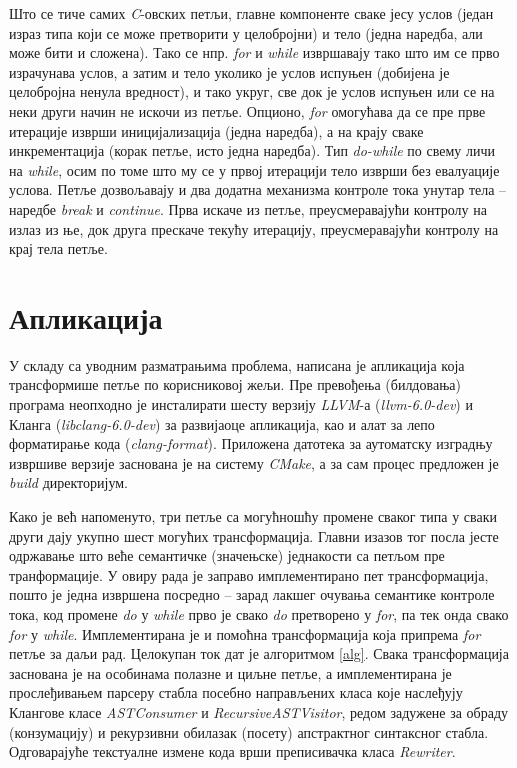 \documentclass[a4paper]{article}
\begin{document}
Што се тиче самих \textit{C}-овских петљи, главне компоненте сваке јесу услов (један израз типа који се може претворити у целобројни) и тело (једна наредба, али може бити и сложена). Тако се нпр. \textit{for} и \textit{while} извршавају тако што им се прво израчунава услов, а затим и тело уколико је услов испуњен (добијена је целобројна ненула вредност), и тако укруг, све док је услов испуњен или се на неки други начин не искочи из петље. Опционо, \textit{for} омогућава да се пре прве итерације изврши иницијализација (једна наредба), а на крају сваке инкрементација (корак петље, исто једна наредба). Тип \textit{do-while} по свему личи на \textit{while}, осим по томе што му се у првој итерацији тело изврши без евалуације услова. Петље дозвољавају и два додатна механизма контроле тока унутар тела -- наредбе \textit{break} и \textit{continue}. Прва искаче из петље, преусмеравајући контролу на излаз из ње, док друга прескаче текућу итерацију, преусмеравајући контролу на крај тела петље.

\section{Апликација}

У складу са уводним разматрањима проблема, написана је апликација која трансформише петље по корисниковој жељи. Пре превођења (билдовања) програма неопходно је инсталирати шесту верзију \textit{LLVM}-а (\textit{llvm-6.0-dev}) и Кланга (\textit{libclang-6.0-dev}) за развијаоце апликација, као и алат за лепо форматирање кода (\textit{clang-format}). Приложена датотека за аутоматску изградњу извршиве верзије заснована је на систему \textit{CMake}, а за сам процес предложен је \textit{build} директоријум.

Како је већ напоменуто, три петље са могућношћу промене сваког типа у сваки други дају укупно шест могућих трансформација. Главни изазов тог посла јесте одржавање што веће семантичке (значењске) једнакости са петљом пре транформације. У овиру рада је заправо имплементирано пет трансформација, пошто је једна извршена посредно -- зарад лакшег очувања семантике контроле тока, код промене \textit{do} у \textit{while} прво је свако \textit{do} претворено у \textit{for}, па тек онда свако \textit{for} у \textit{while}. Имплементирана је и помоћна трансформација која припрема \textit{for} петље за даљи рад. Целокупан ток дат је алгоритмом \ref{alg}. Свака трансформација заснована је на особинама полазне и циљне петље, а имплементирана је прослеђивањем парсеру стабла посебно направљених класа које наслеђују Клангове класе \textit{ASTConsumer} и \textit{RecursiveASTVisitor}, редом задужене за обраду (конзумацију) и рекурзивни обилазак (посету) апстрактног синтаксног стабла. Одговарајуће текстуалне измене кода врши преписивачка класа \textit{Rewriter}.
\end{document}
